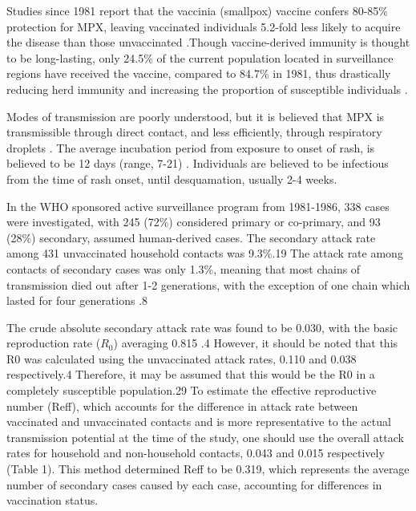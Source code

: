 Studies since 1981 report that the vaccinia (smallpox) vaccine confers 80-85\% protection for MPX, leaving vaccinated individuals 5.2-fold less likely to acquire the disease than those unvaccinated \cite{Fine1988, Rimoin2010}.Though vaccine-derived immunity is thought to be long-lasting, only 24.5\% of the current population located in surveillance regions have received the vaccine, compared to 84.7\% in 1981, thus drastically reducing herd immunity and increasing the proportion of susceptible individuals \cite{Rimoin2010, Jezek1988, Jezek1987}.

Modes of transmission are poorly understood, but it is believed that MPX is transmissible through direct contact, and less efficiently, through respiratory droplets \cite{DiGiulio2004}. The average incubation period from exposure to onset of rash, is believed to be 12 days (range, 7-21) \cite{Jezek1987, Hutin2001}. Individuals are believed to be infectious from the time of rash onset, until desquamation, usually 2-4 weeks. 

In the WHO sponsored active surveillance program from 1981-1986, 338 cases were investigated, with 245 (72\%) considered primary or co-primary, and 93 (28\%) secondary, assumed human-derived cases. The secondary attack rate among 431 unvaccinated household contacts was 9.3\%.19 The attack rate among contacts of secondary cases was only 1.3\%, meaning that most chains of transmission died out after 1-2 generations, with the exception of one chain which lasted for four generations .8 

The crude absolute  secondary attack rate was found to be 0.030, with the basic reproduction rate ($R_{0}$) averaging 0.815 \cite{Fine1988}.4 However, it should be noted that this R0 was calculated using the unvaccinated attack rates, 0.110 and 0.038 respectively.4 Therefore, it may be assumed that this would be the R0 in a completely susceptible population.29 To estimate the effective reproductive number (Reff), which accounts for the difference in attack rate between vaccinated and unvaccinated contacts and is more representative to the actual transmission potential at the time of the study, one should use the overall attack rates for household and non-household contacts, 0.043 and 0.015 respectively (Table 1). This method determined Reff to be 0.319, which represents the average number of secondary cases caused by each case, accounting for differences in vaccination status. 

